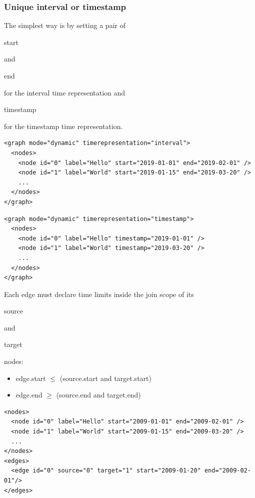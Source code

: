 \documentclass[a4paper,10pt]{article}
\begin{document}
\subsubsection{Unique interval or timestamp}

The simplest way is by setting a pair of \begin{footnotesize}start\end{footnotesize} and \begin{footnotesize}end\end{footnotesize} for the interval time representation and \begin{footnotesize}timestamp\end{footnotesize} for the timestamp time representation.

\lstset{ style=gexf }
\begin{lstlisting}[caption={Node Scope Example with Intervals}]
<graph mode="dynamic" timerepresentation="interval">
  <nodes>
    <node id="0" label="Hello" start="2019-01-01" end="2019-02-01" />
    <node id="1" label="World" start="2019-01-15" end="2019-03-20" />
    ...
  </nodes>
</graph>
\end{lstlisting}

\lstset{ style=gexf }
\begin{lstlisting}[caption={Node Scope Example with Timestamps}]
<graph mode="dynamic" timerepresentation="timestamp">
  <nodes>
    <node id="0" label="Hello" timestamp="2019-01-01" />
    <node id="1" label="World" timestamp="2019-03-20" />
    ...
  </nodes>
</graph>
\end{lstlisting}

Each edge must declare time limits inside the join scope of its \begin{footnotesize}source\end{footnotesize} and \begin{footnotesize}target\end{footnotesize} nodes:
\begin{itemize}
 \item edge.start $\le$ (source.start and target.start)
 \item edge.end   $\ge$ (source.end   and target.end)
\end{itemize}

\lstset{ style=gexf }
\begin{lstlisting}[caption={Edge Scope Example}]
<nodes>
  <node id="0" label="Hello" start="2009-01-01" end="2009-02-01" />
  <node id="1" label="World" start="2009-01-15" end="2009-03-20" />
  ...
</nodes>
<edges>
  <edge id="0" source="0" target="1" start="2009-01-20" end="2009-02-01"/>
</edges>
\end{lstlisting}
\end{document}
